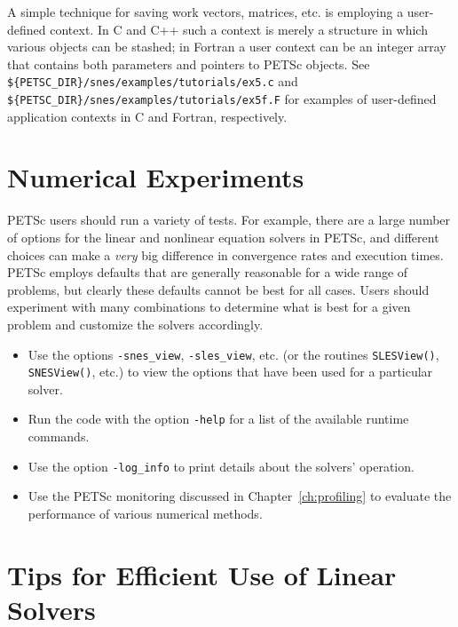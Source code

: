 A simple technique for saving work vectors, matrices, etc. is employing
a user-defined context.  In C and C++ such a context is merely a
structure in which various objects can be stashed; in Fortran a user
context can be an integer array that contains both parameters and pointers
to PETSc objects. See {\tt \$\{PETSC\_DIR\}/snes/examples/tutorials/ex5.c} and 
{\tt \$\{PETSC\_DIR\}/snes/examples/tutorials/ex5f.F} for examples of user-defined application
contexts in C and Fortran, respectively.

\section{Numerical Experiments}

PETSc users should run a variety of tests.  For example, there are a large number of options 
for the linear and nonlinear equation solvers in PETSc, and different 
choices can make a {\em very} big difference in convergence rates and execution 
times.  PETSc employs defaults that are generally reasonable for a wide
range of problems, but clearly these defaults cannot be best for all
cases.  Users should experiment with many combinations to determine 
what is best for a given problem and customize the solvers accordingly.
\begin{itemize}
\item Use the options {\tt -snes\_view}, {\tt -sles\_view}, etc. (or the routines 
     {\tt SLESView()}, {\tt SNESView()}, etc.) to view the options that have been
     used for a particular solver.
\item Run the code with the option {\tt -help} for a list of the available 
     runtime commands.
\item Use the option {\tt -log\_info} to print details about the solvers' operation.
\item Use the PETSc monitoring discussed in Chapter~\ref{ch:profiling}
     to evaluate the performance of various numerical methods.
\end{itemize}

\section{Tips for Efficient Use of Linear Solvers}
\label{sec:slestips}

